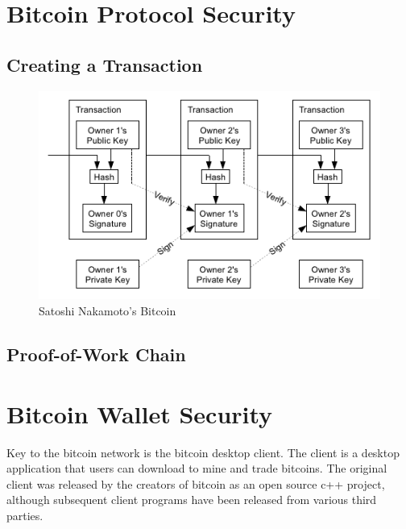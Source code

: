 \documentclass{report}
\begin{document}

\section*{Bitcoin Protocol Security}
\subsection*{Creating a Transaction}
\begin{figure}[h]
  \begin{center}
    \includegraphics{images/coinchain.png}
    \caption{Satoshi Nakamoto's Bitcoin}
    \label{fig:coinchain}
  \end{center}
\end{figure}
\subsection*{Proof-of-Work Chain}

\section*{Bitcoin Wallet Security}
Key to the bitcoin network is the bitcoin desktop client.  The client is a desktop
application that users can download to mine and trade bitcoins.  The original client
was released by the creators of bitcoin as an open source c++ project\cite{Andresen:source}, although
subsequent client programs have been released from various third parties.  
\end{document}
